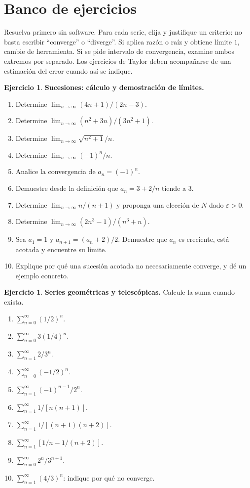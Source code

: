 \documentclass[12pt]{article}
\theoremstyle{definition}
\newtheorem{Ejer}[teorema]{Ejercicio}
\theoremstyle{remark}
\begin{document}
\section{Banco de ejercicios}
Resuelva primero sin software. Para cada serie, elija y justifique un criterio: no basta escribir ``converge'' o ``diverge''. Si aplica razón o raíz y obtiene límite $1$, cambie de herramienta. Si se pide intervalo de convergencia, examine ambos extremos por separado. Los ejercicios de Taylor deben acompañarse de una estimación del error cuando así se indique.

\begin{Ejer}\textbf{Sucesiones: cálculo y demostración de límites.}
\begin{enumerate}[series=banco4]
\item Determine $\lim_{n\to\infty}(4n+1)/(2n-3)$.
\item Determine $\lim_{n\to\infty}(n^2+3n)/(3n^2+1)$.
\item Determine $\lim_{n\to\infty}\sqrt{n^2+1}/n$.
\item Determine $\lim_{n\to\infty}(-1)^n/n$.
\item Analice la convergencia de $a_n=(-1)^n$.
\item Demuestre desde la definición que $a_n=3+2/n$ tiende a $3$.
\item Determine $\lim_{n\to\infty}n/(n+1)$ y proponga una elección de $N$ dado $\varepsilon>0$.
\item Determine $\lim_{n\to\infty}(2n^3-1)/(n^3+n)$.
\item Sea $a_1=1$ y $a_{n+1}=(a_n+2)/2$. Demuestre que $a_n$ es creciente, está acotada y encuentre su límite.
\item Explique por qué una sucesión acotada no necesariamente converge, y dé un ejemplo concreto.
\end{enumerate}
\end{Ejer}

\begin{Ejer}\textbf{Series geométricas y telescópicas.} Calcule la suma cuando exista.
\begin{enumerate}[resume=banco4]
\item $\displaystyle\sum_{n=0}^\infty (1/2)^n$.
\item $\displaystyle\sum_{n=0}^\infty 3(1/4)^n$.
\item $\displaystyle\sum_{n=1}^\infty 2/3^n$.
\item $\displaystyle\sum_{n=0}^\infty (-1/2)^n$.
\item $\displaystyle\sum_{n=1}^\infty (-1)^{n-1}/2^n$.
\item $\displaystyle\sum_{n=1}^\infty 1/[n(n+1)]$.
\item $\displaystyle\sum_{n=1}^\infty 1/[(n+1)(n+2)]$.
\item $\displaystyle\sum_{n=1}^\infty [1/n-1/(n+2)]$.
\item $\displaystyle\sum_{n=0}^\infty 2^n/3^{n+1}$.
\item $\displaystyle\sum_{n=1}^\infty (4/3)^n$: indique por qué no converge.
\end{enumerate}
\end{Ejer}
\end{document}
